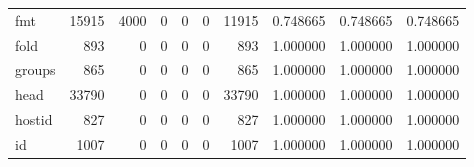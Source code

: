 \begin{longtable}{lrrrrrrrrr}
fmt       &                               15915 &                                            4000 &                                              0 &                                             0 &                                              0 &                                        11915 &                                           0.748665 &                               0.748665 &                             0.748665 \\
fold      &                                 893 &                                               0 &                                              0 &                                             0 &                                              0 &                                          893 &                                           1.000000 &                               1.000000 &                             1.000000 \\
groups    &                                 865 &                                               0 &                                              0 &                                             0 &                                              0 &                                          865 &                                           1.000000 &                               1.000000 &                             1.000000 \\
head      &                               33790 &                                               0 &                                              0 &                                             0 &                                              0 &                                        33790 &                                           1.000000 &                               1.000000 &                             1.000000 \\
hostid    &                                 827 &                                               0 &                                              0 &                                             0 &                                              0 &                                          827 &                                           1.000000 &                               1.000000 &                             1.000000 \\
id        &                                1007 &                                               0 &                                              0 &                                             0 &                                              0 &                                         1007 &                                           1.000000 &                               1.000000 &                             1.000000 \\

\end{longtable}
